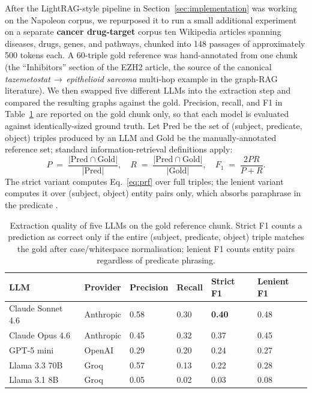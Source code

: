 \documentclass[12pt,a4paper,oneside]{report}
\begin{document}
After the LightRAG-style pipeline in Section~\ref{sec:implementation}
was working on the Napoleon corpus, we repurposed it to run a small
additional experiment on a separate \textbf{cancer drug-target} corpus
ten Wikipedia articles spanning diseases, drugs, genes, and
pathways, chunked into 148 passages of approximately 500 tokens
each. A 60-triple gold reference was hand-annotated from one chunk (the
``Inhibitors'' section of the EZH2 article, the source of the canonical
\emph{tazemetostat\,$\to$\,epithelioid sarcoma} multi-hop example in
the graph-RAG literature). We then swapped five different LLMs into the
extraction step and compared the resulting graphs against the gold.
Precision, recall, and F1 in Table~\ref{tab:empirical_quality} are
reported on the gold chunk only, so that each model is evaluated
against identically-sized ground truth. Let $\mathrm{Pred}$ be the
set of (subject, predicate, object) triples produced by an LLM and
$\mathrm{Gold}$ be the manually-annotated reference set; standard
information-retrieval definitions apply:
\begin{equation}
    P \;=\; \frac{\lvert \mathrm{Pred} \cap \mathrm{Gold} \rvert}{\lvert \mathrm{Pred} \rvert},
    \quad
    R \;=\; \frac{\lvert \mathrm{Pred} \cap \mathrm{Gold} \rvert}{\lvert \mathrm{Gold} \rvert},
    \quad
    F_1 \;=\; \frac{2 P R}{P + R}.
    \label{eq:prf}
\end{equation}
The strict variant computes Eq.~\eqref{eq:prf} over full triples; the
lenient variant computes it over (subject, object) entity pairs only,
which absorbs paraphrase in the predicate \citep{lewis2020}.

\begin{table}[htbp]
\centering
\caption{Extraction quality of five LLMs on the gold reference chunk.
Strict F1 counts a prediction as correct only if the entire
(subject, predicate, object) triple matches the gold after
case/whitespace normalisation; lenient F1 counts entity pairs regardless
of predicate phrasing.}
\label{tab:empirical_quality}
\small
\begin{tabularx}{\textwidth}{@{}lXXXXX@{}}
\toprule
\textbf{LLM} & \textbf{Provider} & \textbf{Precision} & \textbf{Recall} & \textbf{Strict F1} & \textbf{Lenient F1} \\
\midrule
Claude Sonnet 4.6 & Anthropic & 0.58 & 0.30 & \textbf{0.40} & 0.48 \\
Claude Opus 4.6   & Anthropic & 0.45 & 0.32 & 0.37          & 0.45 \\
GPT-5 mini        & OpenAI    & 0.29 & 0.20 & 0.24          & 0.27 \\
Llama 3.3 70B     & Groq      & 0.57 & 0.13 & 0.22          & 0.28 \\
Llama 3.1 8B      & Groq      & 0.05 & 0.02 & 0.03          & 0.08 \\
\bottomrule
\end{tabularx}
\end{table}
\end{document}

